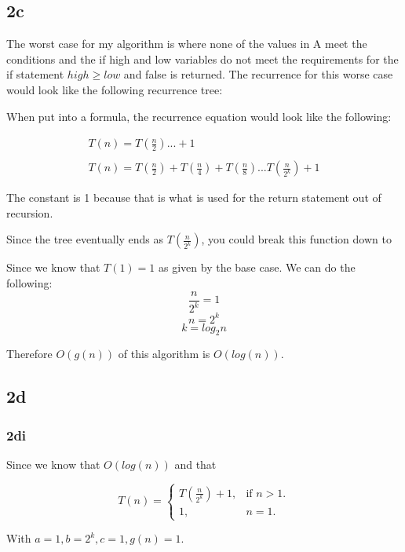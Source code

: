 \documentclass[oneside, a4paper]{article}
\begin{document}
\subsection*{2c}
The worst case for my algorithm is where none of the values in A meet the conditions and the if high and low variables do not meet the requirements for the if statement $high \geq low$ and false is returned. The recurrence for this worse case would look like the following recurrence tree:



When put into a formula, the recurrence equation would look like the following:

\begin{equation}
    \begin{array}{l}
        T(n) = T(\frac{n}{2}) ... + 1\\\\
        T(n) = T(\frac{n}{2}) + T(\frac{n}{4}) + T(\frac{n}{8}) ... T(\frac{n}{2^k}) + 1
      \end{array}
\end{equation}

The constant is 1 because that is what is used for the return statement out of recursion. 

Since the tree eventually ends as $T(\frac{n}{2^k})$, you could break this function down to 

Since we know that $T(1) = 1$ as given by the base case. We can do the following:
$$\frac{n}{2^k} = 1$$
$$n = 2^k$$
$$k = log_2n$$

Therefore $O(g(n))$ of this algorithm is $O(log(n))$.

\subsection*{2d}

\subsubsection*{2di}
Since we know that $O(log(n))$ and that 

\begin{equation}
    T(n)=\begin{cases}
        T(\frac{n}{2^k}) + 1, & \text{if $n>1$}.\\
        1, & \text{$n = 1$}.
    \end{cases}
\end{equation}

With $a = 1, b = 2^k, c = 1, g(n) = 1$. 
\end{document}
